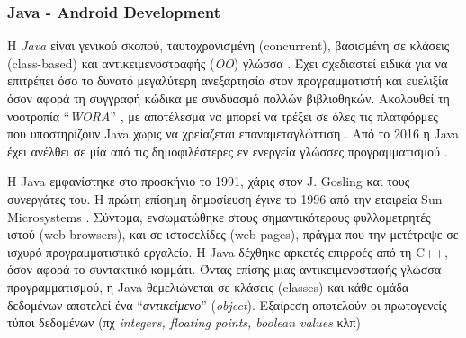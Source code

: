 \subsubsection{Java - Android Development}
Η \textit{Java} είναι γενικού σκοπού, ταυτοχρονισμένη (concurrent), βασισμένη σε κλάσεις (class-based) και αντικειμενοστραφής (\textit{OO}) γλώσσα \cite{[JAVA1]}. Έχει σχεδιαστεί ειδικά για να επιτρέπει όσο το δυνατό μεγαλύτερη ανεξαρτησία στον προγραμματιστή και ευελιξία όσον αφορά τη συγγραφή κώδικα με συνδυασμό πολλών βιβλιοθηκών. Ακολουθεί τη νοοτροπία ``\textit{WORA}'' \cite{[JAVA2]}, με αποτέλεσμα να μπορεί να τρέξει σε όλες τις πλατφόρμες που υποστηρίζουν Java χωρις να χρείαζεται επαναμεταγλώττιση \cite{[JAVA3]}. Από το 2016 η Java έχει ανέλθει σε μία από τις δημοφιλέστερες εν ενεργεία γλώσσες προγραμματισμού \cite{[JAVA4], [JAVA5], [JAVA6]}.

Η Java εμφανίστηκε στο προσκήνιο το 1991, χάρις στον J. Gosling και τους συνεργάτες του. Η πρώτη επίσημη δημοσίευση έγινε το 1996 από την εταιρεία Sun Microsystems \cite{[JAVA8]}. Σύντομα, ενσωματώθηκε στους σημαντικότερους φυλλομετρητές ιστού (web browsers), και σε ιστοσελίδες (web pages), πράγμα που την μετέτρεψε σε ισχυρό προγραμματιστικό εργαλείο. Η Java δέχθηκε αρκετές επιρροές από τη C++, όσον αφορά το συντακτικό κομμάτι. Όντας επίσης μιας αντικειμενοσταφής γλώσσα προγραμματισμού, η Java θεμελιώνεται σε κλάσεις (classes) και κάθε ομάδα δεδομένων αποτελεί ένα ``\textit{αντικείμενο}'' (\textit{object}). Εξαίρεση αποτελούν οι πρωτογενείς τύποι δεδομένων (πχ \textit{integers, floating points, boolean values} κλπ)

